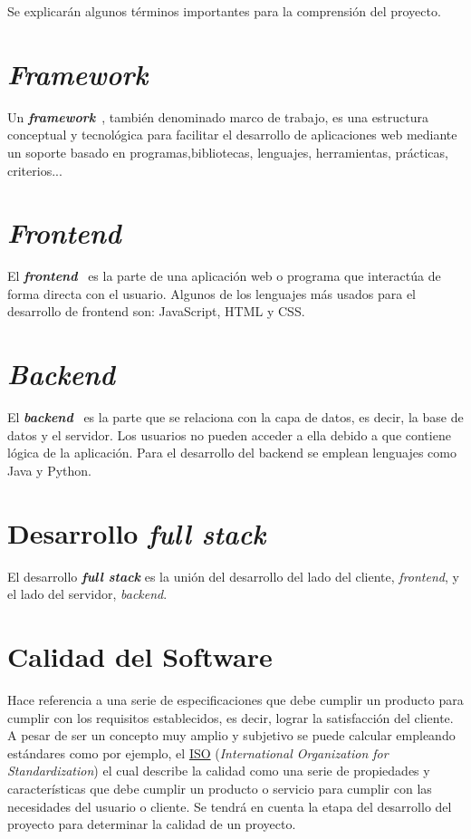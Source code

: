 
Se explicarán algunos términos importantes para la comprensión del proyecto.

\section{\textit{Framework}}
Un \textbf{\textit{framework}}~\cite{framework_definicion}, también denominado marco de trabajo, es una estructura conceptual y tecnológica para facilitar el desarrollo de aplicaciones web mediante un soporte basado en programas,bibliotecas, lenguajes, herramientas, prácticas, criterios...

\section{\textit{Frontend}}
El \textbf{\textit{frontend}}~\cite{frontend_backend} es la parte de una aplicación web o programa que interactúa de forma directa con el usuario. Algunos de los lenguajes más usados para el desarrollo de frontend son: JavaScript, HTML y CSS.

\section{\textit{Backend}}
El \textbf{\textit{backend}}~\cite{frontend_backend} es la parte que se relaciona con la capa de datos, es decir, la base de datos y el servidor. Los usuarios no pueden acceder a ella debido a que contiene lógica de la aplicación. Para el desarrollo del backend se emplean lenguajes como Java y Python.

\section{Desarrollo \textit{full stack}}
El desarrollo \textbf{\textit{full stack}} es la unión del desarrollo del lado del cliente, \textit{frontend}, y el lado del servidor, \textit{backend}.

\section{Calidad del Software}
Hace referencia a una serie de especificaciones que debe cumplir un producto para cumplir con los requisitos establecidos, es decir, lograr la satisfacción del cliente. A pesar de ser un concepto muy amplio y subjetivo se puede calcular empleando estándares como por ejemplo, el \href{https://www.iso.org/home.html}{ISO} (\emph{International Organization for Standardization}) el cual describe la calidad como una serie de propiedades y características que debe cumplir un producto o servicio para cumplir con las necesidades del usuario o cliente. Se tendrá en cuenta la etapa del desarrollo del proyecto para determinar la calidad de un proyecto. 

